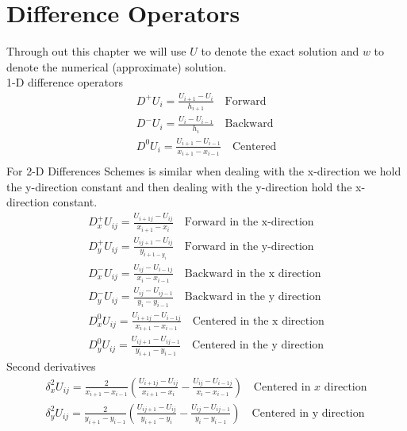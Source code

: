 \section{Difference Operators}
Through out this chapter we will use $U$ to denote the exact solution and 
$w$ to denote the numerical (approximate) solution.\\
1-D difference operators
\begin{eqnarray*}
D^{+}U_{i}=\frac{U_{i+1}-U_{i}}{h_{i+1}} \ \ \ \mbox{ Forward} \\
D^{-}U_{i}=\frac{U_{i}-U_{i-1}}{h_i} \ \ \ \mbox{ Backward} \\
D^{0}U_{i}=\frac{U_{i+1}-U_{i-1}}{x_{i+1}-x_{i-1}} \ \ \ \mbox{ Centered} \\
\end{eqnarray*}
For 2-D Differences Schemes is similar when dealing with the x-direction we hold
the y-direction constant and then dealing with the y-direction hold the x-direction
constant.
\begin{eqnarray*}
D^{+}_xU_{ij}=\frac{U_{i+1j}-U_{ij}}{x_{i+1}-x_{i}} \ \ \ \mbox{ Forward in the x-direction} \\
D^{+}_yU_{ij}=\frac{U_{ij+1}-U_{ij}}{y_{i+1-y_{i}}} \ \ \ \mbox{ Forward in the y-direction} \\
D^{-}_xU_{ij}=\frac{U_{ij}-U_{i-1j}}{x_i-x_{i-1}} \ \ \ \mbox{ Backward in the x direction} \\
D^{-}_yU_{ij}=\frac{U_{ij}-U_{ij-1}}{y_i-y_{i-1}} \ \ \ \mbox{ Backward in the y direction} \\
D^{0}_xU_{ij}=\frac{U_{i+1j}-U_{i-1j}}{x_{i+1}-x_{i-1}} \ \ \ \mbox{ Centered in the x direction} \\
D^{0}_yU_{ij}=\frac{U_{ij+1}-U_{ij-1}}{y_{i+1}-y_{i-1}} \ \ \ \mbox{ Centered in the y direction} 
\end{eqnarray*}
Second derivatives
\begin{eqnarray*}
\delta_x^{2}U_{ij}=\frac{2}{x_{i+1}-x_{i-1}}\left(\frac{U_{i+1j}-U_{ij}}{x_{i+1}-x_{i}}-\frac{U_{ij}-U_{i-1j}}{x_{i}-x_{i-1}}\right) \ \ \ \mbox{ Centered in $x$ direction} \\
\delta_y^{2}U_{ij}=\frac{2}{y_{i+1}-y_{i-1}}\left(\frac{U_{ij+1}-U_{ij}}{y_{i+1}-y_{i}}-\frac{U_{ij}-U_{ij-1}}{y_{i}-y_{i-1}}\right) \ \ \ \mbox{ Centered in y direction} \\
\end{eqnarray*}
